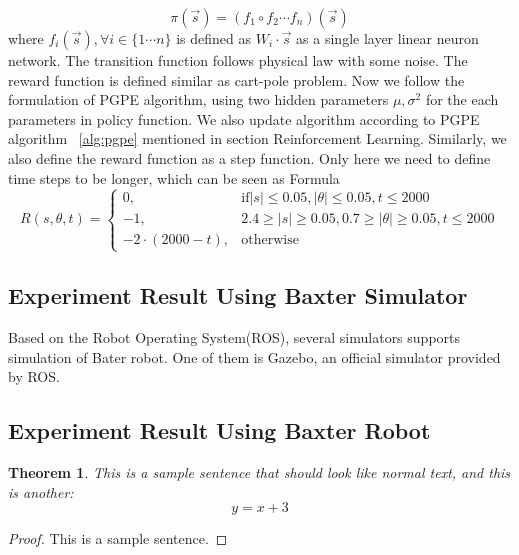 \documentclass[officiallayout]{tktla}
\newtheorem{theorem}{Theorem}[section]
\begin{document}
\begin{equation}
\pi(\vec{s}) = (f_1 \circ f_2 \cdots f_n)(\vec{s})
\end{equation} 
where $f_i(\vec{s}), \forall i \in \{1\cdots n\}$ is defined as $W_i \cdot \vec{s}$ as a single layer linear neuron network.
The transition function follows physical law with some noise. The reward function is defined similar as cart-pole problem.
Now we follow the formulation of PGPE algorithm, using two hidden parameters $\mu, \sigma^2$ for the each parameters in policy function. We also update algorithm according to PGPE algorithm ~\ref{alg:pgpe} mentioned in section Reinforcement Learning. Similarly, we also define the reward function as a step function. Only here we need to define time steps to be longer, which can be seen as Formula~
\begin{equation}
    R(s,\theta, t)= 
\begin{cases}
    0,				& \text{if} |s|\leq 0.05, |\theta| \leq 0.05, t \leq 2000\\
    -1,              & 2.4 \geq |s|\geq 0.05, 0.7 \geq |\theta| \geq 0.05, t \leq 2000 \\
    -2 \cdot (2000 - t), 		& \text{otherwise}
\end{cases}
\end{equation}

\subsection{Experiment Result Using Baxter Simulator}
Based on the Robot Operating System(ROS), several simulators supports simulation of Bater robot. One of them is Gazebo, an official simulator provided by ROS.
\subsection{Experiment Result Using Baxter Robot}



\begin{theorem}
This is a sample sentence that should look like normal text,
and this is another:
\[ y = x+3 \]
\end{theorem}

\begin{proof}
This is a sample sentence.
\end{proof}



\end{document}
